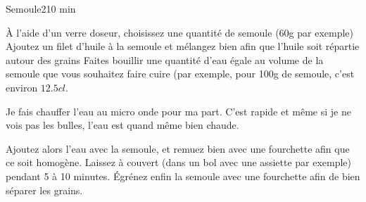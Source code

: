{\begin{recette}{Semoule}{2}{10 min}{}
\begin{preparation}
\etape À l'aide d'un verre doseur, choisissez une quantité de semoule (60g par exemple)
\etape Ajoutez un filet d'huile à la semoule et mélangez bien afin que l'huile soit répartie autour des grains
\etape Faites bouillir une quantité d'eau égale au volume de la semoule que vous souhaitez faire cuire (par exemple, pour 100g 
de semoule, c'est environ $12.5\unit{cl}$. 
\begin{remarque}
Je fais chauffer l'eau au micro onde pour ma part. C'est rapide et même si je ne vois pas les bulles, l'eau est quand même bien 
chaude. 
\end{remarque}
\etape Ajoutez alors l'eau avec la semoule, et remuez bien avec une fourchette afin que ce soit homogène. Laissez à couvert 
(dans un bol avec une assiette par exemple) pendant 5 à 10 minutes.
\etape Égrénez enfin la semoule avec une fourchette afin de bien séparer les grains.
\end{preparation}
\end{recette}


}%
